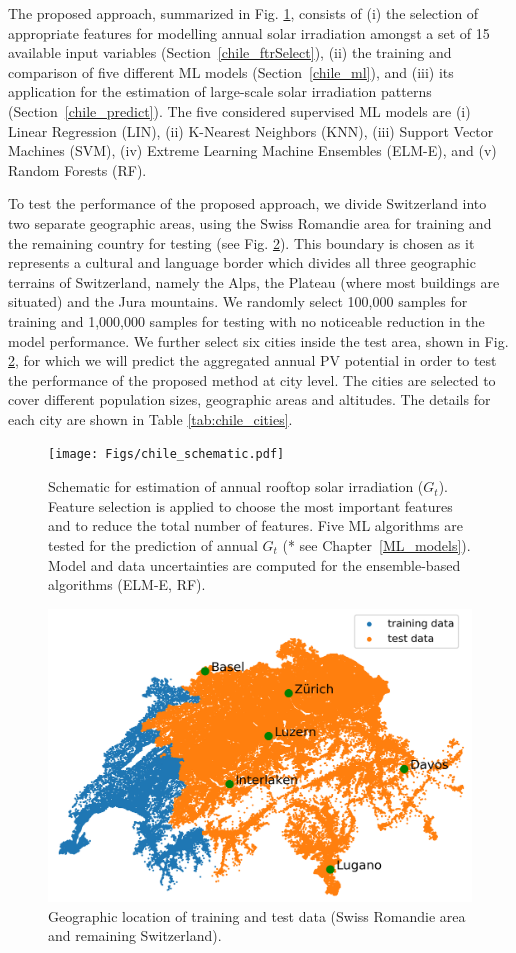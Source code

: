 The proposed approach, summarized in Fig. \ref{fig:chile_schema}, consists of (i) the selection of appropriate features for modelling annual solar irradiation amongst a set of 15 available input variables (Section~\ref{chile_ftrSelect}), (ii) the training and  comparison of five different ML models (Section~\ref{chile_ml}), and (iii) its application for the estimation of large-scale solar irradiation patterns (Section~\ref{chile_predict}). The five considered supervised ML models are (i) Linear Regression (LIN), (ii) K-Nearest Neighbors (KNN), (iii) Support Vector Machines (SVM), (iv) Extreme Learning Machine Ensembles (ELM-E), and (v) Random Forests (RF).

To test the performance of the proposed approach, we divide Switzerland into two separate geographic areas, using the Swiss Romandie area for training and the remaining country for testing (see Fig. \ref{fig:chile_case_study}). This boundary is chosen as it represents a cultural and language border which divides all three geographic terrains of Switzerland, namely the Alps, the Plateau (where most buildings are situated) and the Jura mountains. 
We randomly select 100,000 samples for training and 1,000,000 samples for testing with no noticeable reduction in the model performance. 
We further select six cities inside the test area, shown in Fig. \ref{fig:chile_case_study}, for which we will predict the aggregated annual PV potential in order to test the performance of the proposed method at city level. The cities are selected to cover different population sizes, geographic areas and altitudes. The details for each city are shown in Table \ref{tab:chile_cities}. 


\begin{figure}[tb]
\centering\texttt{[image: Figs/chile\_schematic.pdf]}
\caption{Schematic for estimation of annual rooftop solar irradiation ($G_t$). Feature selection is applied to choose the most important features and to reduce the total number of features. Five ML algorithms are tested for the prediction of annual $G_t$ (* see Chapter~\ref{ML_models}). Model and data uncertainties are computed for the ensemble-based algorithms (ELM-E, RF). }
\label{fig:chile_schema}
\end{figure}

\begin{figure}[tb]
\centering\includegraphics[width=0.6\linewidth]{images/Figs/train_test_w_cities.png}
\caption{Geographic location of training and test data (Swiss Romandie area and remaining Switzerland).}
\label{fig:chile_case_study}
\end{figure}

